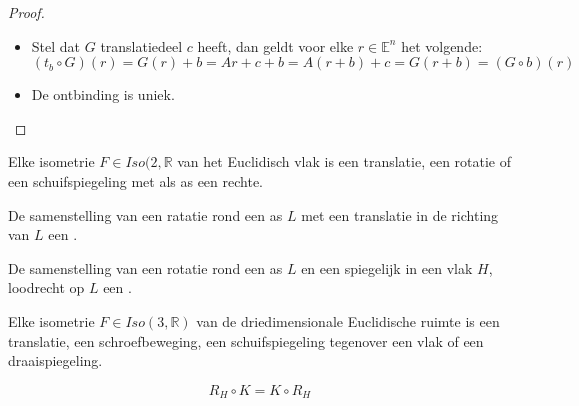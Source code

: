 \documentclass[main.tex]{subfiles}
\begin{document}
\begin{st}
\begin{proof}
\begin{itemize}
  \item Stel dat $G$ translatiedeel $c$ heeft, dan geldt voor elke $r\in \mathbb{E}^{n}$ het volgende:
    \[ (t_{b}\circ G)(r) = G(r) + b = Ar + c + b = A(r+b)+c = G(r+b) = (G\circ b)(r) \]

  \item De ontbinding is uniek.
  \end{itemize}

  \end{proof}
\end{st}

\begin{st}
  Elke isometrie $F\in Iso(2,\mathbb{R}$ van het Euclidisch vlak is een translatie, een rotatie of een schuifspiegeling met als as een rechte.
\end{st}

\begin{de}
  De samenstelling van een ratatie rond een as $L$ met een translatie in de richting van $L$ een .
\end{de}

\begin{de}
  De samenstelling van een rotatie rond een as $L$ en een spiegelijk in een vlak $H$, loodrecht op $L$ een .
\end{de}

\begin{st}
  Elke isometrie $F\in Iso(3,\mathbb{R})$ van de driedimensionale Euclidische ruimte is een translatie, een schroefbeweging, een schuifspiegeling tegenover een vlak of een draaispiegeling.
\end{st}

\begin{st}
  \[ R_{H} \circ K = K \circ R_{H} \]
\end{st}
\end{document}
